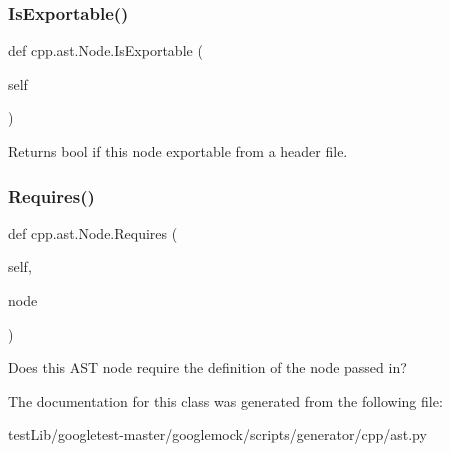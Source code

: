 \subsubsection{\texorpdfstring{Is\+Exportable()}{IsExportable()}}
{\footnotesize\ttfamily def cpp.\+ast.\+Node.\+Is\+Exportable (\begin{DoxyParamCaption}\item[{}]{self }\end{DoxyParamCaption})}

\begin{DoxyVerb}Returns bool if this node exportable from a header file.\end{DoxyVerb}
 \mbox{\label{classcpp_1_1ast_1_1Node_a31ae211f954a8c578ef16226df5ac8c8}} 
\subsubsection{\texorpdfstring{Requires()}{Requires()}}
{\footnotesize\ttfamily def cpp.\+ast.\+Node.\+Requires (\begin{DoxyParamCaption}\item[{}]{self,  }\item[{}]{node }\end{DoxyParamCaption})}

\begin{DoxyVerb}Does this AST node require the definition of the node passed in?\end{DoxyVerb}
 

The documentation for this class was generated from the following file\+:\begin{DoxyCompactItemize}
\item 
test\+Lib/googletest-\/master/googlemock/scripts/generator/cpp/ast.\+py\end{DoxyCompactItemize}

